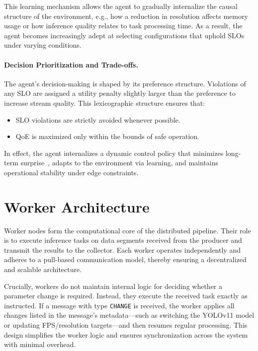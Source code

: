 This learning mechanism allows the agent to gradually internalize the causal structure of the environment, e.g., how a reduction in resolution affects memory usage or how inference quality relates to task processing time. As a result, the agent becomes increasingly adept at selecting configurations that uphold SLOs under varying conditions.

\paragraph{Decision Prioritization and Trade-offs.}
The agent’s decision-making is shaped by its preference structure. Violations of any SLO are assigned a utility penalty slightly larger than the preference to increase stream quality. This lexicographic structure ensures that:

\begin{itemize}
  \item SLO violations are strictly avoided whenever possible.
  \item QoE is maximized only within the bounds of safe operation.
\end{itemize}

In effect, the agent internalizes a dynamic control policy that minimizes long-term surprise~\cite{sedlak_adaptive_2024}, adapts to the environment via learning, and maintains operational stability under edge constraints.

\section{Worker Architecture}
\label{sec:implementation-worker-architecture}
Worker nodes form the computational core of the distributed pipeline. Their role is to execute inference tasks on data segments received from the producer and transmit the results to the collector. Each worker operates independently and adheres to a pull-based communication model, thereby ensuring a decentralized and scalable architecture.

Crucially, workers do not maintain internal logic for deciding whether a parameter change is required. Instead, they execute the received task exactly as instructed. If a message with type \texttt{CHANGE} is received, the worker applies all changes listed in the message's metadata—such as switching the YOLOv11 model or updating FPS/resolution targets—and then resumes regular processing. This design simplifies the worker logic and ensures synchronization across the system with minimal overhead.

